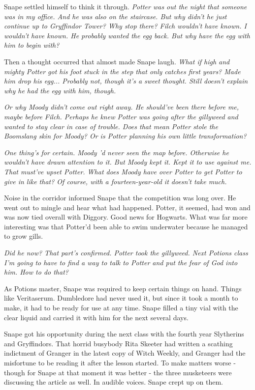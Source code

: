 Snape settled himself to think it through. \emph{Potter was out the night that someone was in my office. And he was also on the staircase. But why didn't he just continue up to Gryffindor Tower? Why stop there? Filch wouldn't have known. I wouldn't have known. He probably wanted the egg back. But why have the egg with him to begin with?}

Then a thought occurred that almost made Snape laugh. \emph{What if high and mighty Potter got his foot stuck in the step that only catches first years? Made him drop his egg... Probably not, though it's a sweet thought. Still doesn't explain why he had the egg with him, though.}

\emph{Or why Moody didn't come out right away. He should've been there before me, maybe before Filch. Perhaps he knew Potter was going after the gillyweed and wanted to stay clear in case of trouble. Does that mean Potter stole the Boomslang skin for Moody? Or is Potter planning his own little transformation?}

\emph{One thing's for certain. Moody 'd never seen the map before. Otherwise he wouldn't have drawn attention to it. But Moody kept it. Kept it to use against me. That must've upset Potter. What does Moody have over Potter to get Potter to give in like that? Of course, with a fourteen-year-old it doesn't take much.}

Noise in the corridor informed Snape that the competition was long over. He went out to mingle and hear what had happened. Potter, it seemed, had won and was now tied overall with Diggory. Good news for Hogwarts. What was far more interesting was that Potter'd been able to swim underwater because he managed to grow gills.

\emph{Did he now? That part's confirmed. Potter took the gillyweed. Next Potions class I'm going to have to find a way to talk to Potter and put the fear of God into him. How to do that?}

As Potions master, Snape was required to keep certain things on hand. Things like Veritaserum. Dumbledore had never used it, but since it took a month to make, it had to be ready for use at any time. Snape filled a tiny vial with the clear liquid and carried it with him for the next several days.

Snape got his opportunity during the next class with the fourth year Slytherins and Gryffindors. That horrid busybody Rita Skeeter had written a scathing indictment of Granger in the latest copy of Witch Weekly, and Granger had the misfortune to be reading it after the lesson started. To make matters worse - though for Snape at that moment it was better - the three musketeers were discussing the article as well. In audible voices. Snape crept up on them.

